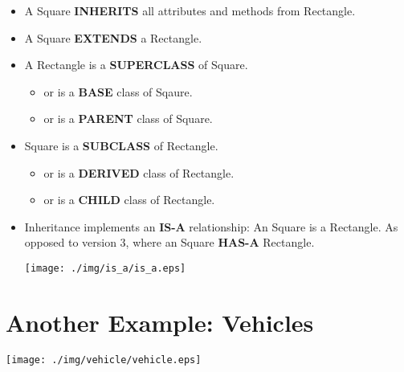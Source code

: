 \documentclass[a4paper, 9pt]{extarticle}
\begin{document}
\begin{itemize}

  \item A Square \textbf{INHERITS} all attributes and methods from Rectangle.

  \item A Square \textbf{EXTENDS} a Rectangle.

  \item A Rectangle is a \textbf{SUPERCLASS} of Square.

    \begin{itemize}

      \item or is a \textbf{BASE} class of Sqaure.

      \item or is a \textbf{PARENT} class of Square.

    \end{itemize}

  \item Square is a \textbf{SUBCLASS} of Rectangle.

    \begin{itemize}

      \item or is a \textbf{DERIVED} class of Rectangle.

      \item or is a \textbf{CHILD} class of Rectangle.

    \end{itemize}

  \item Inheritance implements an \textbf{IS-A} relationship: An Square is a
    Rectangle.  As opposed to version 3, where an Square \textbf{HAS-A}
    Rectangle.

    \begin{center}
      \texttt{[image: ./img/is\_a/is\_a.eps]}
    \end{center}

\end{itemize}







\section{Another Example: Vehicles}

\begin{center}
  \texttt{[image: ./img/vehicle/vehicle.eps]}
\end{center}
\end{document}
